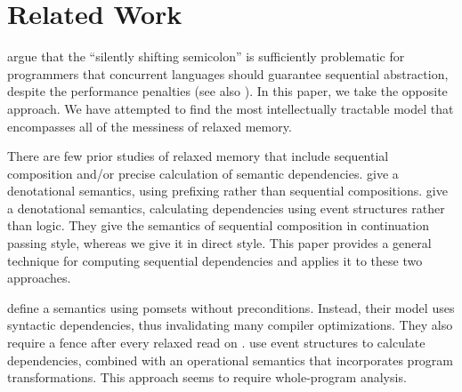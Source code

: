 \section{Related Work}
\label{sec:related}

\citet{DBLP:conf/snapl/MarinoMMNS15} argue that the ``silently shifting
semicolon'' is sufficiently problematic for programmers that concurrent
languages should guarantee sequential abstraction, despite the performance
penalties (see also \citet{10.1145/3462206}).  In this paper, we take the
opposite approach.  We have attempted to find the most intellectually
tractable model that encompasses all of the messiness of relaxed memory.

There are few prior studies of relaxed memory that include sequential
composition and/or precise calculation of semantic dependencies.
\citet{DBLP:journals/pacmpl/JagadeesanJR20} give a denotational semantics,
using prefixing rather than sequential compositions.
\citet{DBLP:conf/esop/PaviottiCPWOB20} give a denotational semantics,
calculating dependencies using event structures rather than logic.  They give
the semantics of sequential composition in continuation passing style,
whereas we give it in direct style.  This paper provides a general technique
for computing sequential dependencies and applies it to these two approaches.




\citet{DBLP:journals/corr/abs-1804-04214} define a semantics
using pomsets without preconditions. Instead, their model uses syntactic
dependencies, thus invalidating many compiler optimizations.  They also
require a fence after every relaxed read on \armeight{}.
%
\citet{Pichon-Pharabod:2016:CSR:2837614.2837616} use event structures to
calculate dependencies, combined with an operational semantics that
incorporates program transformations.  This approach seems to require
whole-program analysis.




